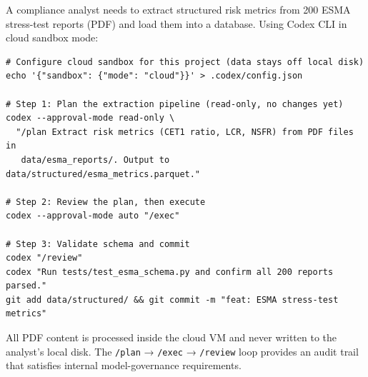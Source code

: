 \begin{example}
\label{ex:codex-filing}
A compliance analyst needs to extract structured risk metrics from 200 ESMA
stress-test reports (PDF) and load them into a database.  Using Codex CLI in
cloud sandbox mode:

\begin{verbatim}
# Configure cloud sandbox for this project (data stays off local disk)
echo '{"sandbox": {"mode": "cloud"}}' > .codex/config.json

# Step 1: Plan the extraction pipeline (read-only, no changes yet)
codex --approval-mode read-only \
  "/plan Extract risk metrics (CET1 ratio, LCR, NSFR) from PDF files in
   data/esma_reports/. Output to data/structured/esma_metrics.parquet."

# Step 2: Review the plan, then execute
codex --approval-mode auto "/exec"

# Step 3: Validate schema and commit
codex "/review"
codex "Run tests/test_esma_schema.py and confirm all 200 reports parsed."
git add data/structured/ && git commit -m "feat: ESMA stress-test metrics"
\end{verbatim}

All PDF content is processed inside the cloud VM and never written to the
analyst's local disk.  The \texttt{/plan} → \texttt{/exec} → \texttt{/review}
loop provides an audit trail that satisfies internal model-governance
requirements.
\end{example}
